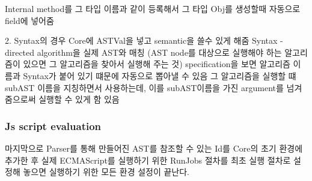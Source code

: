 Internal method를 그 타입 이름과 같이 등록해서 그 타입 Obj를 생성할때 자동으로 field에 넣어줌

2. Syntax의 경우 Core에 ASTVal을 넣고 semantic을 쓸수 있게 해줌
Syntax - directed algorithm을 실제 AST와 매칭 (AST node를 대상으로 실행해야 하는 알고리즘이 있으면 그 알고리즘을 찾아서 실행해 주는 것)
specification을 보면 알고리즘 이름과 Syntax가 붙어 있기 떄문에 자동으로 뽑아낼 수 있음
그 알고리즘을 실행할 떄 subAST 이름을 지칭하면서 사용하는데, 이를 subAST이름을 가진 argument를 넘겨줌으로써 실행할 수 있게 함
있음



\subsubsection{Js script evaluation}
 마지막으로 Parser를 통해 만들어진 AST를 참조할 수 있는 Id를 Core의 초기 환경에 추가한 후 실제 ECMAScript를 실행하기 위한 RunJobs 절차를 최초 실행 절차로 설정해 놓으면 실행하기 위한 모든 환경 설정이 끝난다.


